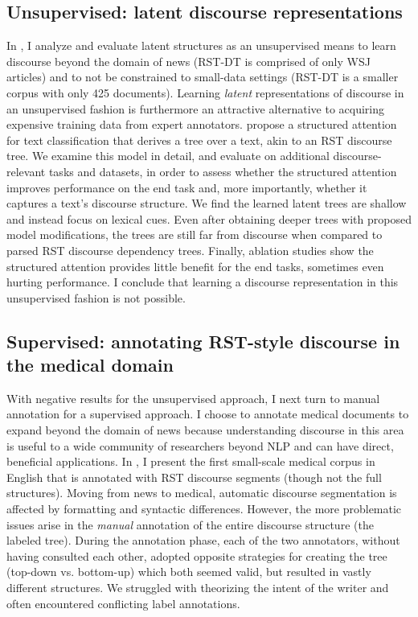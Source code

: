 \subsection{Unsupervised: latent discourse representations} 
In , I analyze and evaluate latent structures as an unsupervised means to learn discourse beyond the domain of news (RST-DT is comprised of only WSJ articles) and to not be constrained to small-data settings (RST-DT is a smaller corpus with only 425 documents).  Learning \emph{latent} representations of discourse in an unsupervised fashion is furthermore an attractive alternative to acquiring expensive training data from expert annotators. \citet{Liu:2018} propose a structured attention for text classification that derives a tree over a text, akin to an RST discourse tree. We examine this model in detail, and evaluate on additional discourse-relevant tasks and datasets, in order to assess whether the structured attention improves performance on the end task and, more importantly, whether it captures a text's discourse structure. We find the learned latent trees are shallow and instead focus on lexical cues. Even after obtaining deeper trees with proposed model modifications, the trees are still far from discourse when compared to parsed RST discourse dependency trees. Finally, ablation studies show the structured attention provides little benefit for the end tasks, sometimes even hurting performance. I conclude that learning a discourse representation in this unsupervised fashion is not possible.

\subsection{Supervised: annotating RST-style discourse in the medical domain} With negative results for the unsupervised approach, I next turn to manual annotation for a supervised approach. I choose to annotate medical documents to expand beyond the domain of news because understanding discourse in this area is useful to a wide community of researchers beyond NLP and can have direct, beneficial applications. In , I present the first small-scale medical corpus in English that is annotated with RST discourse segments (though not the full structures). Moving from news to medical, automatic discourse segmentation is affected by formatting and syntactic differences. However, the more problematic issues arise in the \emph{manual} annotation of the entire discourse structure (the labeled tree). During the annotation phase, each of the two annotators, without having consulted each other, adopted opposite strategies for creating the tree (top-down vs. bottom-up) which both seemed valid, but resulted in vastly different structures. We struggled with theorizing the intent of the writer and often encountered conflicting label annotations. 

